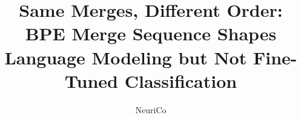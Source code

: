 \documentclass{article}
\title{Same Merges, Different Order: BPE Merge Sequence Shapes Language Modeling but Not Fine-Tuned Classification}
\author{NeuriCo}
\begin{document}
\maketitle

\begin{abstract}

\end{abstract}










\appendix

\end{document}
